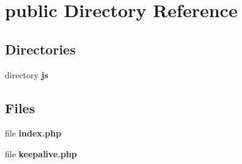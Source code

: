 \section{public Directory Reference}
\label{dir_313883d67671e50b86d8f9b5ddee3518}
\subsection*{Directories}
\begin{DoxyCompactItemize}
\item 
directory {\bf js}
\end{DoxyCompactItemize}
\subsection*{Files}
\begin{DoxyCompactItemize}
\item 
file {\bf index.\+php}
\item 
file {\bf keepalive.\+php}
\end{DoxyCompactItemize}
